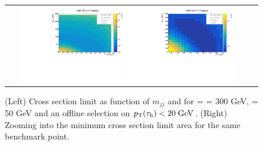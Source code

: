 \begin{figure}[tbh!]
	\centering
	\begin{tabular}{cc}
		\includegraphics[width=0.45\textwidth]{analysis/pics/JetInvMass_vs_MET_xsec_chi300_lsp050_taupt20.pdf}
		\includegraphics[width=0.45\textwidth]{analysis/pics/JetInvMass_vs_MET_xsec_chi300_lsp050_taupt20_zoom.pdf}
	\end{tabular}
	\caption{(Left) Cross section limit as function of $m_{jj}$ and \met for \charginopm = \neutralinotwo = 300 GeV, \neutralinoone = 50 GeV and an offline selection on $p_{\text{T}}(\tau_{\text{h}}) <  20\;\text{Ge}\kern-0.06667em\text{V}$. (Right) Zooming into the minimum cross section limit area for the same benchmark point.}
	\label{fig::JetInvMass_vs_MET_xsec_chi300_lsp050_taupt20}
\end{figure}


